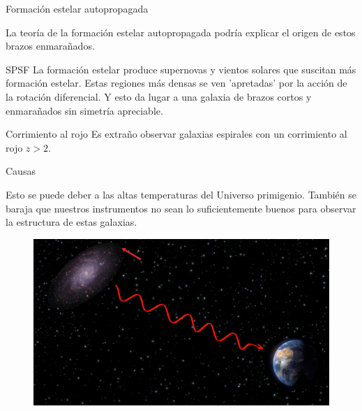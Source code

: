 \documentclass{beamer}
\begin{document}
\begin{frame}{Formación estelar autopropagada}

La teoría de la formación estelar autopropagada podría explicar el origen de estos brazos enmarañados.

\begin{block}{SPSF}
La formación estelar produce supernovas y vientos solares que suscitan más formación estelar. Estas regiones más densas se ven 'apretadas' por la acción de la rotación diferencial. Y esto da lugar a una galaxia de brazos cortos y enmarañados sin simetría apreciable. \cite{cosmo}
\end{block}
\end{frame}
\begin{frame}{Corrimiento al rojo}
Es extraño observar galaxias espirales con un corrimiento al rojo $z > 2$. \cite{corrimiento}

\begin{alertblock}{Causas}

Esto se puede deber a las altas temperaturas del Universo primigenio. También se baraja que nuestros instrumentos no sean lo suficientemente buenos para observar la estructura de estas galaxias.

\end{alertblock}

\begin{figure}[h!]
\begin{center}
\includegraphics[scale=0.1]{rojo.jpg}
\end{center}
\end{figure}
\end{frame}
\end{document}
